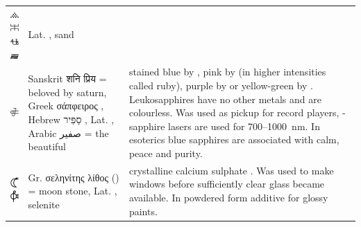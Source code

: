 \documentclass[british,final,landscape]{scrartcl}
\begin{document}
\begin{refsection}
\begin{supertabular}{p{0.3\textwidth}p{0.34\textwidth}p{0.34\textwidth}}
   \includegraphics[width=5mm]{Mineral/Sand} \includegraphics[width=5mm]{Mineral/Sand2} \includegraphics[width=5mm]{Mineral/Sand3} \includegraphics[width=5mm]{Mineral/Sand4} & Lat. , sand & \\
   \includegraphics[width=5mm]{Mineral/Sapphire} & Sanskrit \foreignlanguage{sanskrit}{शनि प्रिय}  = beloved by saturn, Greek \foreignlanguage{greek}{σάπφειρος} , Hebrew \foreignlanguage{hebrew}{סַפִּיר} , Lat. , Arabic \foreignlanguage{arabic}{صفير}  = the beautiful &  stained blue by , pink by  (in higher intensities called ruby), purple by  or yellow-green by . Leukosapphires have no other metals and are colourless. Was used as pickup for record players, -sapphire lasers are used for \num{700}--\SI{1000}{nm}. In esoterics blue sapphires are associated with calm, peace and purity. \\
   \includegraphics[width=5mm]{Mineral/Selenite} \includegraphics[width=5mm]{Mineral/Selenite2} & Gr. \foreignlanguage{greek}{σεληνίτης λίθος} () = moon stone, Lat. , selenite & crystalline calcium sulphate . Was used to make windows before sufficiently clear glass became available. In powdered form additive for glossy paints.  \\

\end{supertabular}
\end{refsection}
\end{document}
